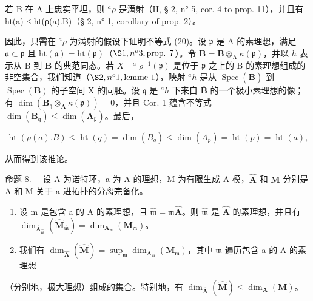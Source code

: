 若 B 在 A 上忠实平坦，则 \(^{a}\rho\) 是满射（II, § 2, n° 5, cor. 4 to prop. 11），并且有 ht(a) ≤ ht(ρ(a).B)（§ 2, n° 1, corollary of prop. 2）。

因此，只需在 \(^a\rho\) 为满射的假设下证明不等式 (20)。设 \(\mathfrak{p}\) 是 A 的素理想，满足 \(\mathfrak{a} \subset \mathfrak{p}\) 且 \(\mathrm{ht}(\mathfrak{a}) = \mathrm{ht}(\mathfrak{p})\)（\(\S 1, n^o 3, \text{prop. } 7\)）。令 \(\overline{\mathbf{B}} = \mathbf{B} \otimes_{\mathbf{A}} \kappa(\mathfrak{p})\)，并以 \(h\) 表示从 B 到 \(\overline{\mathbf{B}}\) 的典范同态。若 \(X = ^a\rho^{-1}(\mathfrak{p})\) 是位于 \(\mathfrak{p}\) 之上的 B 的素理想组成的非空集合，我们知道（\(\S 2, n^o 1, \text{lemme 1}\)），映射 \(^ah\) 是从 \(\operatorname{Spec}(\overline{\mathbf{B}})\) 到 \(\operatorname{Spec}(\mathbf{B})\) 的子空间 X 的同胚。设 \(\mathfrak{q}\) 是 \(^ah\) 下来自 \(\overline{\mathbf{B}}\) 的一个极小素理想的像；有 \(\dim(\mathbf{B}_{\mathfrak{q}} \otimes_{\mathbf{A}} \kappa(\mathfrak{p})) = 0\)，并且 Cor. 1 蕴含不等式 \(\dim(\mathbf{B}_{\mathfrak{q}}) \leqslant \dim(\mathbf{A}_{\mathfrak{p}})\)。最后，

\[
\operatorname{ht} (\rho (a). B) \leqslant \operatorname{ht} (q) = \dim (B _ {q}) \leqslant \dim (A _ {p}) = \operatorname{ht} (p) = \operatorname{ht} (a),
\]

从而得到该推论。

命题 8.--- 设 A 为诺特环，a 为 A 的理想，M 为有限生成 A-模，\(\hat{\mathbf{A}}\) 和 \(\hat{\mathbf{M}}\) 分别是 A 和 M 关于 a-进拓扑的分离完备化。

\begin{enumerate}
\def\labelenumi{\alph{enumi})}
\item
  设 m 是包含 a 的 A 的素理想，且 \(\hat{\mathfrak{m}} = \mathfrak{m}\hat{\mathbf{A}}\)。则 \(\hat{\mathfrak{m}}\) 是 \(\hat{\mathbf{A}}\) 的素理想，并且有 \(\dim_{\hat{\mathbf{A}}_{\hat{\mathfrak{m}}}}(\hat{\mathbf{M}}_{\hat{\mathfrak{m}}}) = \dim_{\mathbf{A}_{\mathfrak{m}}}(\mathbf{M}_{\mathfrak{m}})\)。
\item
  我们有 \(\dim_{\hat{\mathbf{A}}}(\hat{\mathbf{M}}) = \sup_{\mathfrak{m}} \dim_{\mathbf{A}_{\mathfrak{m}}}(\mathbf{M}_{\mathfrak{m}})\)，其中 \(\mathfrak{m}\) 遍历包含 a 的 A 的素理想
\end{enumerate}

（分别地，极大理想）组成的集合。特别地，有 \(\dim_{\hat{\mathbf{A}}}(\hat{\mathbf{M}}) \leqslant \dim_{\mathbf{A}}(\mathbf{M})\)。

